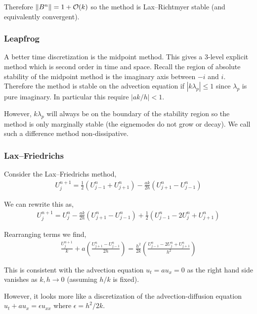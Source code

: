 \documentclass[12pt]{article}
\begin{document}
Therefore \( \left\lVert B^n\right\rVert = 1+\mathcal{O}(k) \) so the method is Lax--Richtmyer stable (and equivalently convergent).

\subsubsection{Leapfrog}
A better time discretization is the midpoint method. This gives a 3-level explicit method which is second order in time and space. Recall the region of absolute stability of the midpoint method is the imaginary axis between \( -i \) and \( i \). Therefore the method is stable on the advection equation if \( |k\lambda_p| \leq 1 \) since \( \lambda_p \) is pure imaginary. In particular this require \( |ak/h| < 1 \).

However, \( k\lambda_p \) will always be on the boundary of the stability region so the method is only marginally stable (the eignemodes do not grow or decay). We call such a difference method non-dissipative.

\subsubsection{Lax--Friedrichs}
Consider the Lax--Friedrichs method,
\begin{align*}
    U_j^{n+1} = \frac{1}{2} \left( U_{j-1}^n + U_{j+1}^n \right) - \frac{ak}{2h}(U_{j+1}^n - U_{j-1}^n)
\end{align*}

We can rewrite this as,
\begin{align*}
    U_j^{n+1} = U_j^n - \frac{ak}{2h}(U_{j+1}^n-U_{j-1}^n) + \frac{1}{2} (U_{j-1}^n  -2U_j^n+U_{j+1}^n)
\end{align*}

Rearranging terms we find,
\begin{align*}
    \frac{U_j^{n+1}}{k} + a \left( \frac{U_{j+1}^n-U_{j-1}^n}{2h} \right) = \frac{h^2}{2k} \left( \frac{U_{j-1}^n-2U_j^n + U_{j+1}^n}{h^2} \right)
\end{align*}

This is consistent with the advection equation \( u_t = a u_x = 0 \) as the right hand side vanishes as \( k,h\to 0 \) (assuming \( h/k \) is fixed).

However, it looks more like a discretization of the advection-diffusion equation \( u_t +au_x = \epsilon u_{xx} \) where \( \epsilon = h^2/2k \).
\end{document}
